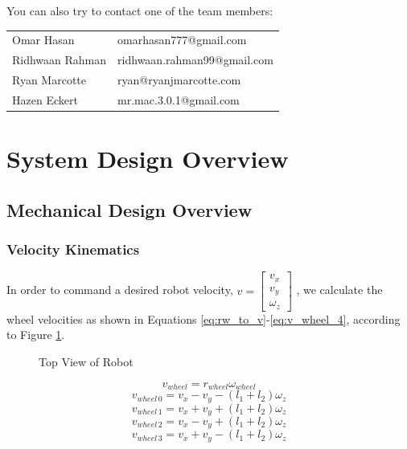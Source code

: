 \documentclass[letterpaper,12pt]{article}
\begin{document}
You can also try to contact one of the team members:\\
\begin{center}
\begin{tabular}{l l}
    Omar Hasan & omarhasan777@gmail.com \\
    Ridhwaan Rahman & ridhwaan.rahman99@gmail.com \\
    Ryan Marcotte & ryan@ryanjmarcotte.com \\
    Hazen Eckert & mr.mac.3.0.1@gmail.com \\
\end{tabular}
\end{center}

\pagebreak
\tableofcontents
\pagebreak

\section{System Design Overview}

\subsection{Mechanical Design Overview}
\subsubsection{Velocity Kinematics}
\label{sec:ar9331_vel_kin}

In order to command a desired robot velocity,
\begin{math}
  v=
  \begin{bmatrix}
    v_x \\
    v_y \\
    \omega_z
  \end{bmatrix}
\end{math}
, we calculate the wheel velocities as shown in Equations \ref{eq:rw_to_v}-\ref{eq:v_wheel_4}, according to Figure \ref{fig:robot_top_view}.

\begin{figure}[h!]
  \centering
  
  \caption{Top View of Robot}
  \label{fig:robot_top_view}
\end{figure}

\begin{equation}
  v_{wheel}=r_{wheel}\omega_{wheel}
  \label{eq:rw_to_v}
\end{equation}
\begin{equation}
  v_{wheel\,0}=v_x-v_y-(l_1+l_2)\omega_z
  \label{eq:v_wheel_1}
\end{equation}
\begin{equation}
  v_{wheel\,1}=v_x+v_y+(l_1+l_2)\omega_z
  \label{eq:v_wheel_2}
\end{equation}
\begin{equation}
  v_{wheel\,2}=v_x-v_y+(l_1+l_2)\omega_z
  \label{eq:v_wheel_3}
\end{equation}
\begin{equation}
  v_{wheel\,3}=v_x+v_y-(l_1+l_2)\omega_z
  \label{eq:v_wheel_4}
\end{equation}
\end{document}
